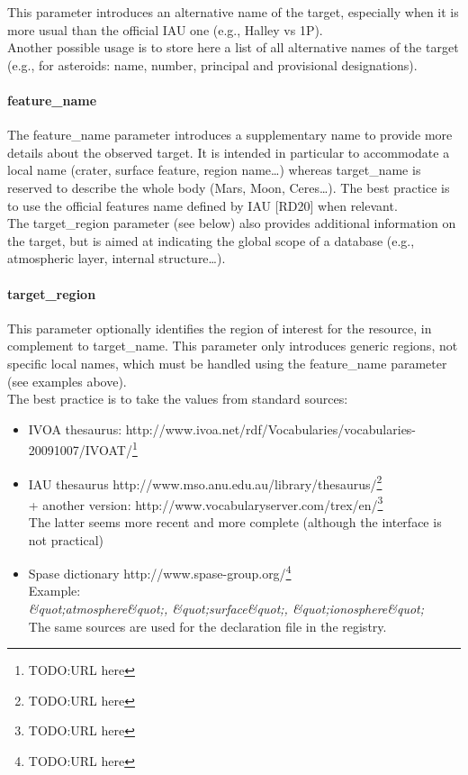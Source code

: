 \documentclass[11pt,a4paper]{ivoa}
\begin{document}
This parameter introduces an alternative name of the target, especially when it is more usual than the official IAU one (e.g., Halley vs 1P).\\Another possible usage is to store here a list of all alternative names of the target (e.g., for asteroids: name, number, principal and provisional designations).

\paragraph{feature\_name}

The feature\_name parameter introduces a supplementary name to provide more details about the observed target. It is intended in particular to accommodate a local name (crater, surface feature, region name…) whereas target\_name is reserved to describe the whole body (Mars, Moon, Ceres…). The best practice is to use the official features name defined by IAU [RD20] when relevant.\\ The target\_region parameter (see below) also provides additional information on the target, but is aimed at indicating the global scope of a database (e.g., atmospheric layer, internal structure…).

\paragraph{target\_region}

This parameter optionally identifies the region of interest for the resource, in complement to target\_name. This parameter only introduces generic regions, not specific local names, which must be handled using the feature\_name parameter (see examples above).\\ The best practice is to take the values from standard sources:

\begin{itemize}
\item IVOA thesaurus: http://www.ivoa.net/rdf/Vocabularies/vocabularies-20091007/IVOAT/\footnote{TODO:URL here}
\item IAU thesaurus http://www.mso.anu.edu.au/library/thesaurus/\footnote{TODO:URL here}\\ + another version: http://www.vocabularyserver.com/trex/en/\footnote{TODO:URL here}\\ The latter seems more recent and more complete (although the interface is not practical)
\item Spase dictionary http://www.spase-group.org/\footnote{TODO:URL here}\\Example: \\\emph{\&quot;atmosphere\&quot;, \&quot;surface\&quot;, \&quot;ionosphere\&quot;}\\ The same sources are used for the declaration file in the registry.
\end{itemize}
\end{document}
